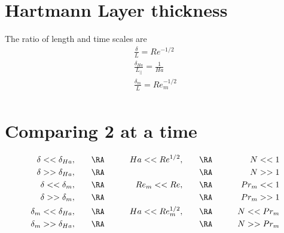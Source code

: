 \documentclass[11pt]{article}
\begin{document}
\doublespacing
\MOONSTITLE
\maketitle

\section{Hartmann Layer thickness}
The ratio of length and time scales are
\begin{equation}\begin{aligned}
	\frac{\delta}{L} = Re^{-1/2} \\
	\frac{\delta_{Ha}}{L_{||}} = \frac{1}{Ha} \\
	\frac{\delta_m}{L} = Re_m^{-1/2} \\
\end{aligned}\end{equation}

\section{Comparing 2 at a time}
\begin{equation}\begin{aligned}
	\delta   <<  \delta_{Ha}, & \qquad \RA \qquad & Ha   << Re^{1/2}  , \qquad & \RA \qquad & N   << 1    \\
	\delta   >>  \delta_{Ha}, & \qquad \RA \qquad &                            & \RA \qquad & N   >> 1    \\
	\delta   <<  \delta_m   , & \qquad \RA \qquad & Re_m << Re        , \qquad & \RA \qquad & Pr_m<< 1    \\
	\delta   >>  \delta_m   , & \qquad \RA \qquad &                            & \RA \qquad & Pr_m>> 1    \\
	\delta_m <<  \delta_{Ha}, & \qquad \RA \qquad & Ha   << Re_m^{1/2}, \qquad & \RA \qquad & N   << Pr_m \\
	\delta_m >>  \delta_{Ha}, & \qquad \RA \qquad &                            & \RA \qquad & N   >> Pr_m \\
\end{aligned}\end{equation}
\end{document}
